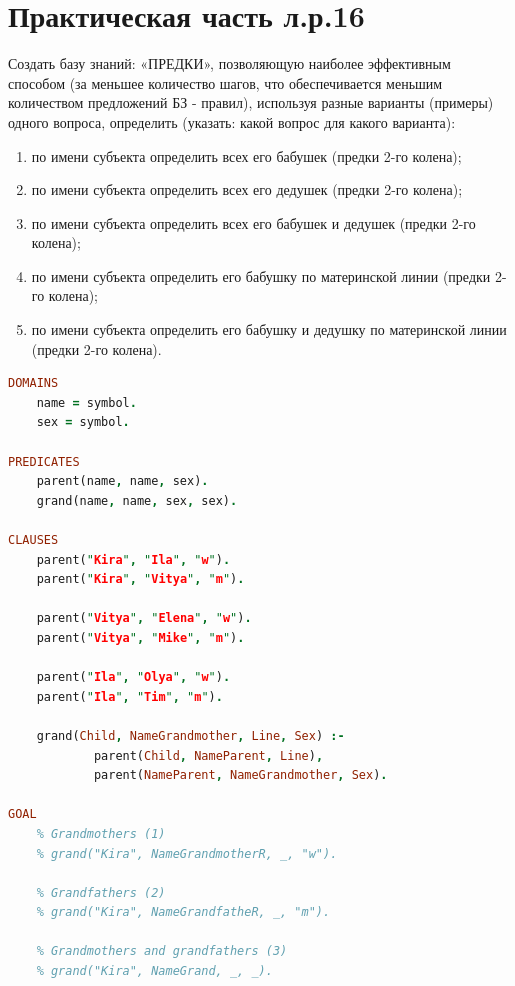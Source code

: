 \documentclass[a4paper,oneside,12pt]{extreport}
\begin{document}


\section*{Практическая часть л.р.16}

\begin{task}
    Создать базу знаний: «ПРЕДКИ», позволяющую наиболее эффективным способом
    (за меньшее количество шагов, что обеспечивается меньшим количеством предложений БЗ -
    правил), используя разные варианты (примеры) одного вопроса, определить (указать: какой
    вопрос для какого варианта):

    \begin{enumerate}
        \item по имени субъекта определить всех его бабушек (предки 2-го колена);
        \item по имени субъекта определить всех его дедушек (предки 2-го колена);
        \item по имени субъекта определить всех его бабушек и дедушек (предки 2-го колена);
        \item по имени субъекта определить его бабушку по материнской линии (предки 2-го колена);
        \item по имени субъекта определить его бабушку и дедушку по материнской линии (предки 2-го колена).
    \end{enumerate}

    \begin{lstlisting}[language=Prolog]
DOMAINS 
    name = symbol.
    sex = symbol.
    
PREDICATES
    parent(name, name, sex).
    grand(name, name, sex, sex).
    
CLAUSES
    parent("Kira", "Ila", "w").
    parent("Kira", "Vitya", "m").
    
    parent("Vitya", "Elena", "w").
    parent("Vitya", "Mike", "m").
    
    parent("Ila", "Olya", "w").
    parent("Ila", "Tim", "m").
    
    grand(Child, NameGrandmother, Line, Sex) :- 
            parent(Child, NameParent, Line), 
            parent(NameParent, NameGrandmother, Sex).
        
GOAL
    % Grandmothers (1)
    % grand("Kira", NameGrandmotherR, _, "w").
    
    % Grandfathers (2)
    % grand("Kira", NameGrandfatheR, _, "m").
    
    % Grandmothers and grandfathers (3)
    % grand("Kira", NameGrand, _, _).
    

\end{lstlisting}
\end{task}
\end{document}
